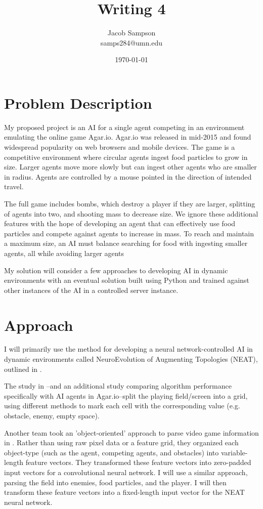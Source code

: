 \documentclass[11pt]{article}
\title{Writing 4}
\author{
Jacob Sampson\\samps284@umn.edu
}
\date{\today}
\begin{document}
\maketitle

\section*{Problem Description}

My proposed project is an AI for a single agent competing in an environment emulating the online game Agar.io. Agar.io was released in mid-2015 and found widespread popularity on web browsers and mobile devices. The game is a competitive environment where circular agents ingest food particles to grow in size. Larger agents move more slowly but can ingest other agents who are smaller in radius. Agents are controlled by a mouse pointed in the direction of intended travel.

The full game includes bombs, which destroy a player if they are larger, splitting of agents into two, and shooting mass to decrease size. We ignore these additional features with the hope of developing an agent that can effectively use food particles and compete against agents to increase in mass. To reach and maintain a maximum size, an AI must balance searching for food with ingesting smaller agents, all while avoiding larger agents

My solution will consider a few approaches to developing AI in dynamic environments with an eventual solution built using Python and trained against other instances of the AI in a controlled server instance.

\section*{Approach}

I will primarily use the method for developing a neural network-controlled AI in dynamic environments called NeuroEvolution of Augmenting Topologies (NEAT), outlined in \cite{stanley2002evolving}. 

The study in \cite{stanley2002evolving}--and an additional study \cite{anso2019deep} comparing algorithm performance specifically with AI agents in Agar.io--split the playing field/screen into a grid, using different methods to mark each cell with the corresponding value (e.g. obstacle, enemy, empty space).

Another team took an 'object-oriented' approach to parse video game information in \cite{woof2018learning}. Rather than using raw pixel data or a feature grid, they organized each object-type (such as the agent, competing agents, and obstacles) into variable-length feature vectors. They transformed these feature vectors into zero-padded input vectors for a convolutional neural network. I will use a similar approach, parsing the field into enemies, food particles, and the player. I will then transform these feature vectors into a fixed-length input vector for the NEAT neural network.
\end{document}
